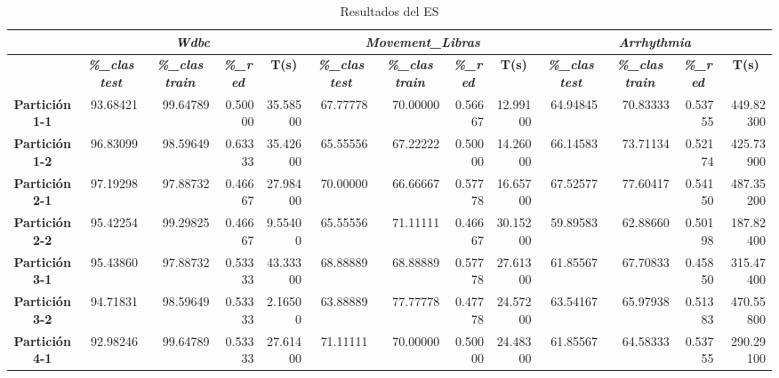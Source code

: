 \documentclass[a4paper,11pt]{article}
\begin{document}
    
   \begin{table}[H]	
    \caption*{Resultados del ES}
    \begin{adjustbox}{width=1.1\textwidth}
    \begin{tabular}{|c|r|r|r|r|r|r|r|r|r|r|r|r|}
    \hline
    \multicolumn{1}{|l|}{} & \multicolumn{ 4}{c|}{\textbf{\textit{Wdbc}}} & \multicolumn{ 4}{c|}{\textbf{\textit{Movement\_Libras}}} & \multicolumn{ 4}{c|}{\textbf{\textit{Arrhythmia}}} \\ \hline
    & \multicolumn{1}{c|}{\textbf{\textit{\%\_clas test}}} & \multicolumn{1}{c|}{\textbf{\textit{\%\_clas train}}} & \multicolumn{1}{c|}{\textbf{\textit{\%\_red}}} & \multicolumn{1}{c|}{\textbf{T(s)}} & \multicolumn{1}{c|}{\textbf{\textit{\%\_clas test}}} & \multicolumn{1}{c|}{\textbf{\textit{\%\_clas train}}} & \multicolumn{1}{c|}{\textbf{\textit{\%\_red}}} & \multicolumn{1}{c|}{\textbf{T(s)}} & \multicolumn{1}{c|}{\textbf{\textit{\%\_clas test}}} & \multicolumn{1}{c|}{\textbf{\textit{\%\_clas train}}} & \multicolumn{1}{c|}{\textbf{\textit{\%\_red}}} & \multicolumn{1}{c|}{\textbf{T(s)}} \\ \hline
    \textbf{Partición 1-1} & 93.68421 & 99.64789 & 0.50000 & 35.58500 & 67.77778 & 70.00000 & 0.56667 & 12.99100 & 64.94845 & 70.83333 & 0.53755 & 449.82300 \\ \hline
    \textbf{Partición 1-2} & 96.83099 & 98.59649 & 0.63333 & 35.42600 & 65.55556 & 67.22222 & 0.50000 & 14.26000 & 66.14583 & 73.71134 & 0.52174 & 425.73900 \\ \hline
    \textbf{Partición 2-1} & 97.19298 & 97.88732 & 0.46667 & 27.98400 & 70.00000 & 66.66667 & 0.57778 & 16.65700 & 67.52577 & 77.60417 & 0.54150 & 487.35200 \\ \hline
    \textbf{Partición 2-2} & 95.42254 & 99.29825 & 0.46667 & 9.55400 & 65.55556 & 71.11111 & 0.46667 & 30.15200 & 59.89583 & 62.88660 & 0.50198 & 187.82400 \\ \hline
    \textbf{Partición 3-1} & 95.43860 & 97.88732 & 0.53333 & 43.33300 & 68.88889 & 68.88889 & 0.57778 & 27.61300 & 61.85567 & 67.70833 & 0.45850 & 315.47400 \\ \hline
    \textbf{Partición 3-2} & 94.71831 & 98.59649 & 0.53333 & 2.16500 & 63.88889 & 77.77778 & 0.47778 & 24.57200 & 63.54167 & 65.97938 & 0.51383 & 470.55800 \\ \hline
    \textbf{Partición 4-1} & 92.98246 & 99.64789 & 0.53333 & 27.61400 & 71.11111 & 70.00000 & 0.50000 & 24.48300 & 61.85567 & 64.58333 & 0.53755 & 290.29100 \\ \hline

\end{tabular}
\end{adjustbox}
\end{table}
\end{document}
